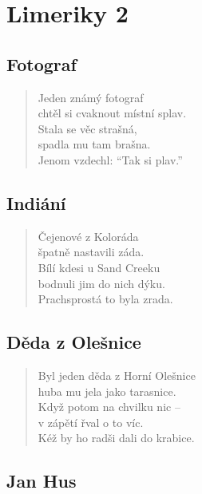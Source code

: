 \section{Limeriky 2}

\begin{multicols}{2}
	
	
	
	\subsection{Fotograf}
	
	\begin{verse}
	Jeden známý fotograf\\
	chtěl si cvaknout místní splav.\\
	Stala se věc strašná,\\
	spadla mu tam brašna.\\
	Jenom vzdechl: “Tak si plav.”
	\end{verse}
	
	
\subsection{Indiání}
	
\begin{verse}
Čejenové z Koloráda\\
špatně nastavili záda.\\
Bílí kdesi u Sand Creeku\\
bodnuli jim do nich dýku.\\
Prachsprostá to byla zrada.
\end{verse}
	
\subsection{Děda z Olešnice}
	
\begin{verse}
Byl jeden děda z Horní Olešnice\\
huba mu jela jako tarasnice.\\
Když potom na chvilku nic --\\
v zápětí řval o to víc.\\
Kéž by ho radši dali do krabice.
\end{verse}
	
	\columnbreak
	
\subsection{Jan Hus}
	

\end{multicols}
